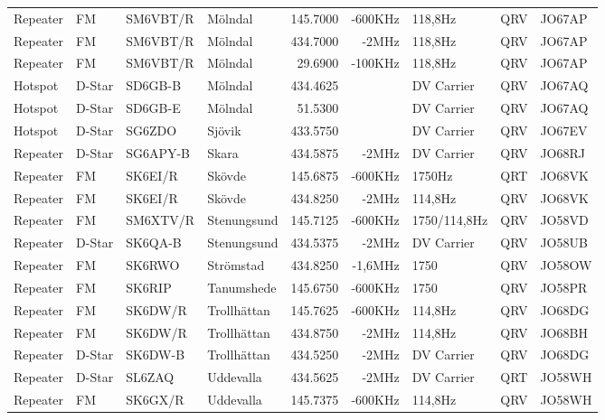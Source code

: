 \begin{longtable}{llllrrlcl}
Repeater & FM     & SM6VBT/R & Mölndal             & 145.7000  & -600KHz & 118,8Hz         & QRV  & JO67AP \\
Repeater & FM     & SM6VBT/R & Mölndal             & 434.7000  & -2MHz   & 118,8Hz         & QRV  & JO67AP \\
Repeater & FM     & SM6VBT/R & Mölndal             & 29.6900   & -100KHz & 118,8Hz         & QRV  & JO67AP \\
Hotspot  & D-Star & SD6GB-B  & Mölndal             & 434.4625  &         & DV Carrier      & QRV  & JO67AQ \\
Hotspot  & D-Star & SD6GB-E  & Mölndal             & 51.5300   &         & DV Carrier      & QRV  & JO67AQ \\
Hotspot  & D-Star & SG6ZDO   & Sjövik              & 433.5750  &         & DV Carrier      & QRV  & JO67EV \\
Repeater & D-Star & SG6APY-B & Skara               & 434.5875  & -2MHz   & DV Carrier      & QRV  & JO68RJ \\
Repeater & FM     & SK6EI/R  & Skövde              & 145.6875  & -600KHz & 1750Hz          & QRT  & JO68VK \\
Repeater & FM     & SK6EI/R  & Skövde              & 434.8250  & -2MHz   & 114,8Hz         & QRV  & JO68VK \\
Repeater & FM     & SM6XTV/R & Stenungsund         & 145.7125  & -600KHz & 1750/114,8Hz    & QRV  & JO58VD \\
Repeater & D-Star & SK6QA-B  & Stenungsund         & 434.5375  & -2MHz   & DV Carrier      & QRV  & JO58UB \\
Repeater & FM     & SK6RWO   & Strömstad           & 434.8250  & -1,6MHz & 1750            & QRV  & JO58OW \\
Repeater & FM     & SK6RIP   & Tanumshede          & 145.6750  & -600KHz & 1750            & QRV  & JO58PR \\
Repeater & FM     & SK6DW/R  & Trollhättan         & 145.7625  & -600KHz & 114,8Hz         & QRV  & JO68DG \\
Repeater & FM     & SK6DW/R  & Trollhättan         & 434.8750  & -2MHz   & 114,8Hz         & QRV  & JO68BH \\
Repeater & D-Star & SK6DW-B  & Trollhättan         & 434.5250  & -2MHz   & DV Carrier      & QRV  & JO68DG \\
Repeater & D-Star & SL6ZAQ   & Uddevalla           & 434.5625  & -2MHz   & DV Carrier      & QRT  & JO58WH \\
Repeater & FM     & SK6GX/R  & Uddevalla           & 145.7375  & -600KHz & 114,8Hz         & QRV  & JO58WH \\

\end{longtable}
